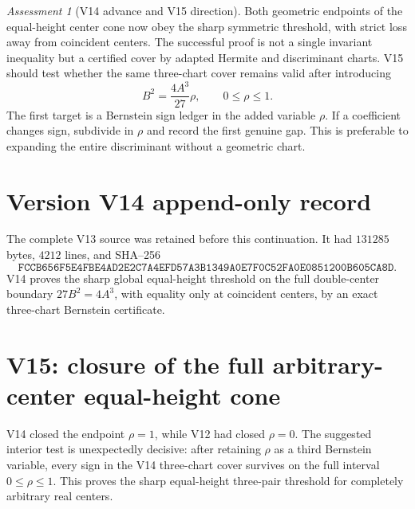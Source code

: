 \documentclass[11pt]{article}
\theoremstyle{definition}
\theoremstyle{remark}
\newtheorem{assessment}[theorem]{Assessment}
\begin{document}
\begin{assessment}[V14 advance and V15 direction]
Both geometric endpoints of the equal-height center cone now obey the
sharp symmetric threshold, with strict loss away from coincident centers.
The successful proof is not a single invariant inequality but a certified
cover by adapted Hermite and discriminant charts.  V15 should test whether
the same three-chart cover remains valid after introducing
\[
 B^2=\frac{4A^3}{27}\rho,\qquad 0\leq\rho\leq1.
 \tag{N14.19}
\]
The first target is a Bernstein sign ledger in the added variable \(\rho\).
If a coefficient changes sign, subdivide in \(\rho\) and record the first
genuine gap.  This is preferable to expanding the entire discriminant
without a geometric chart.
\end{assessment}

\section*{Version V14 append-only record}
The complete V13 source was retained before this continuation.  It had
\(131285\) bytes, \(4212\) lines, and SHA--256
\[
 \texttt{FCCB656F5E4FBE4AD2E2C7A4EFD57A3B1349A0E7F0C52FA0E0851200B605CA8D}.
\]
V14 proves the sharp global equal-height threshold on the full
double-center boundary \(27B^2=4A^3\), with equality only at coincident
centers, by an exact three-chart Bernstein certificate.




\section{V15: closure of the full arbitrary-center equal-height cone}

V14 closed the endpoint \(\rho=1\), while V12 had closed \(\rho=0\).
The suggested interior test is unexpectedly decisive: after retaining
\(\rho\) as a third Bernstein variable, every sign in the V14 three-chart
cover survives on the full interval \(0\leq\rho\leq1\).  This proves the
sharp equal-height three-pair threshold for completely arbitrary real
centers.
\end{document}
